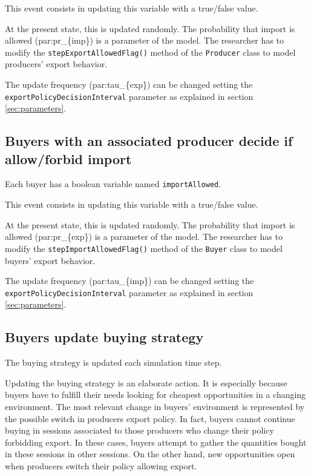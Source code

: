 \documentclass{article}
\begin{document}
This event consists in updating this variable with a true/false value.

At the present state, this is updated randomly. The probability that import is allowed (\gls{par:pr_{imp}}) is a parameter of the model. The researcher has to modify the \verb+stepExportAllowedFlag()+ method of the \verb+Producer+ class to model producers' export behavior.

The update frequency (\gls{par:tau_{exp}}) can be changed setting the \verb+exportPolicyDecisionInterval+ parameter as explained in section \ref{sec:parameters}.

\subsection{Buyers with an associated producer decide if allow/forbid import}

Each buyer has a boolean variable named \verb+importAllowed+. 

This event consists in updating this variable with a true/false value.

At the present state, this is updated randomly. The probability that import is allowed (\gls{par:pr_{exp}}) is a parameter of the model. The researcher has to modify the \verb+stepImportAllowedFlag()+ method of the \verb+Buyer+ class to model buyers' export behavior.

The update frequency (\gls{par:tau_{imp}}) can be changed setting the \verb+exportPolicyDecisionInterval+ parameter as explained in section \ref{sec:parameters}.

\subsection{Buyers update buying strategy}\label{subsec:buyingStrategy}
The buying strategy is updated each simulation time step.

Updating the buying strategy is an elaborate action. It is especially because buyers have to fulfill their needs looking for cheapest opportunities in a changing environment. The most relevant change in buyers' environment is represented by the possible switch in producers export policy. In fact, buyers cannot continue buying in sessions associated to those producers who change their policy forbidding export. In these cases, buyers attempt to gather the quantities bought in these sessions in other sessions. On the other hand, new opportunities open when producers switch their policy allowing export. 
\end{document}
